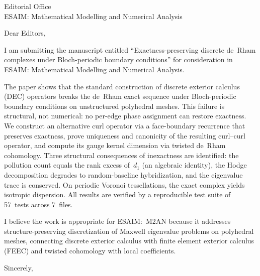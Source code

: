 \documentclass[12pt]{letter}
\begin{document}
\begin{letter}{Editorial Office\\ESAIM: Mathematical Modelling and Numerical Analysis}

\opening{Dear Editors,}

I am submitting the manuscript entitled ``Exactness-preserving discrete
de~Rham complexes under Bloch-periodic boundary conditions'' for
consideration in ESAIM: Mathematical Modelling and Numerical Analysis.

The paper shows that the standard construction of discrete exterior
calculus (DEC) operators breaks the de~Rham exact sequence under
Bloch-periodic boundary conditions on unstructured polyhedral meshes.
This failure is structural, not numerical: no per-edge phase assignment
can restore exactness. We construct an alternative curl operator via a
face-boundary recurrence that preserves exactness, prove uniqueness and
canonicity of the resulting curl--curl operator, and compute its gauge
kernel dimension via twisted de~Rham cohomology. Three structural
consequences of inexactness are identified: the pollution count equals
the rank excess of~$d_1$ (an algebraic identity), the Hodge decomposition
degrades to random-baseline hybridization, and the eigenvalue trace is
conserved. On periodic Voronoi tessellations, the exact complex yields
isotropic dispersion. All results are verified by a reproducible test
suite of 57~tests across 7~files.

I believe the work is appropriate for ESAIM:~M2AN because it addresses
structure-preserving discretization of Maxwell eigenvalue problems on
polyhedral meshes, connecting discrete exterior calculus with finite
element exterior calculus (FEEC) and twisted cohomology with local
coefficients.

\closing{Sincerely,}

\end{letter}
\end{document}

